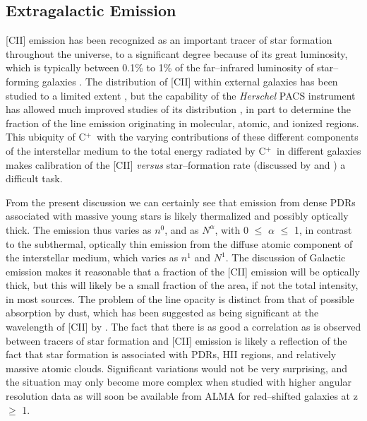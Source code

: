 \documentclass[12pt]{aastex}
\def \cp{C$^+$}
\def \C2{C{\sc II}}
\begin{document}

\subsection{Extragalactic Emission}

[\C2] emission has been recognized as an important tracer of star formation throughout the universe, to a significant degree because of its great luminosity, which is typically between 0.1\% to 1\% of the far--infrared luminosity of star--forming galaxies \citep{madden1993, malhotra2001, stacey2010}.  
The distribution of [\C2] within external galaxies has been studied to a limited extent \citep{poglitsch1995, rodriguez2006}, but the capability of the  {\it Herschel} PACS instrument has allowed much improved studies of its distribution  \citep{mookerjea2011}, in part to determine the fraction of the line emission originating in molecular, atomic, and ionized regions.  
This ubiquity of \cp\ with the varying contributions of these different components of the interstellar medium to the total energy radiated by \cp\ in different galaxies makes calibration of the [\C2]  {\it versus} star--formation rate (discussed by \citet{boselli2002} and \cite{delooze2011}) a difficult task.

From the present discussion we can certainly see that emission from dense PDRs associated with massive young stars is likely thermalized and possibly optically thick.  
The emission thus varies as $n^0$, and as $N^{\alpha}$, with 0 $\leq$ $\alpha$ $\leq$ 1, in contrast to the subthermal, optically thin emission from the diffuse atomic component of the interstellar medium, which varies as $n^1$ and $N^1$.  
The discussion of Galactic emission makes it reasonable that a fraction of the [\C2] emission will be optically thick, but this will likely be a small fraction of the area, if not the total intensity, in most sources. 
The problem of the line opacity is distinct from that of possible absorption by dust, which has been suggested as being significant at the wavelength of [\C2] by \cite{papadopoulos2010}.
The fact that there is as good a correlation as is observed between tracers of star formation and [\C2] emission is likely a reflection of the fact that star formation is associated with PDRs, HII regions, and relatively massive atomic clouds. 
Significant variations would not be very surprising, and the situation may only become more complex when studied with higher angular resolution data as will soon be available from ALMA for red--shifted galaxies at z $\geq$ 1.
\end{document}
